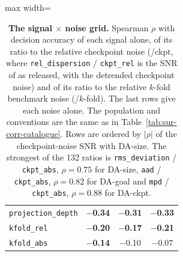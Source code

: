 \begin{table}[t]
\begin{adjustbox}{max width=\textwidth}
\begin{tabular}{@{}lrrrrrrrrr@{}}
\texttt{projection\_depth} & \multicolumn{3}{c}{\textbf{$-$0.34}} & \multicolumn{3}{c}{\textbf{$-$0.31}} & \multicolumn{3}{c}{\textbf{$-$0.33}} \\
\texttt{kfold\_rel} & \multicolumn{3}{c}{\textbf{$-$0.20}} & \multicolumn{3}{c}{\textbf{$-$0.17}} & \multicolumn{3}{c}{\textbf{$-$0.21}} \\
\texttt{kfold\_abs} & \multicolumn{3}{c}{\textbf{$-$0.14}} & \multicolumn{3}{c}{$-$0.10} & \multicolumn{3}{c}{$-$0.07} \\
\bottomrule
\end{tabular}
\end{adjustbox}
\caption{\textbf{The signal $\times$ noise grid.} Spearman $\rho$ with decision accuracy of each signal alone, of its ratio to the relative checkpoint noise (/ckpt, where \texttt{rel\_dispersion} / \texttt{ckpt\_rel} is the SNR of \citet{heineman_signal_2025} as released, with the detrended checkpoint noise) and of its ratio to the relative $k$-fold benchmark noise (/$k$-fold). The last rows give each noise alone. The population and conventions are the same as in Table~\ref{tab:sur-corr-catalogue}. Rows are ordered by $|\rho|$ of the checkpoint-noise SNR with DA-size. The strongest of the 132 ratios is \texttt{rms\_deviation} / \texttt{ckpt\_abs}, $\rho = 0.75$ for DA-size, \texttt{aad} / \texttt{ckpt\_abs}, $\rho = 0.82$ for DA-goal and \texttt{mpd} / \texttt{ckpt\_abs}, $\rho = 0.88$ for DA-ckpt.}
\label{tab:sur-corr-snr}
\end{table}

